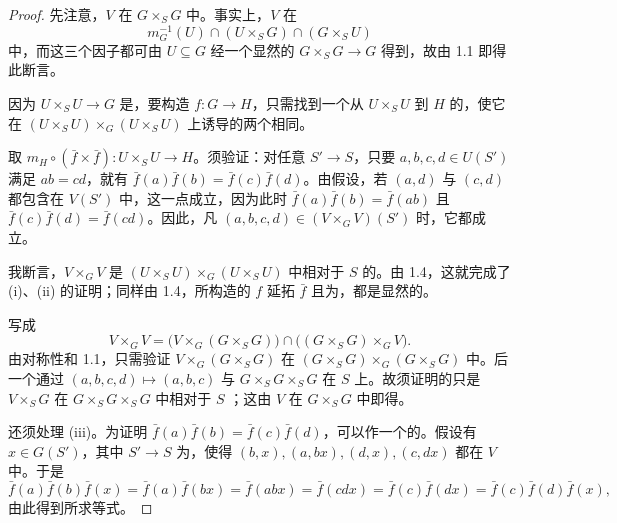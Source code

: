 \begin{proof}
先注意，$V$ 在 $G\times_S G$ 中。事实上，$V$ 在
\[
m_G^{-1}(U)\cap(U\times_S G)\cap(G\times_S U)
\]
中，而这三个因子都可由 $U\subseteq G$ 经一个显然的 $G\times_S G\to G$ 得到，故由 1.1 即得此断言。

因为 $U\times_S U\to G$ 是，要构造 $f:G\to H$，只需找到一个从 $U\times_S U$ 到 $H$ 的，使它在 $(U\times_S U)\times_G(U\times_S U)$ 上诱导的两个相同。

取 $m_H\circ(\bar f\times\bar f):U\times_S U\to H$。须验证：对任意 $S'\to S$，只要 $a,b,c,d\in U(S')$ 满足 $ab=cd$，就有 $\bar f(a)\bar f(b)=\bar f(c)\bar f(d)$。由假设，若 $(a,d)$ 与 $(c,d)$ 都包含在 $V(S')$ 中，这一点成立，因为此时 $\bar f(a)\bar f(b)=\bar f(ab)$ 且 $\bar f(c)\bar f(d)=\bar f(cd)$。因此，凡 $(a,b,c,d)\in(V\times_G V)(S')$ 时，它都成立。

我断言，$V\times_G V$ 是 $(U\times_S U)\times_G(U\times_S U)$ 中相对于 $S$ 的。由 1.4，这就完成了 (i)、(ii) 的证明；同样由 1.4，所构造的 $f$ 延拓 $\bar f$ 且为，都是显然的。

写成
\[
V\times_G V=\bigl(V\times_G(G\times_S G)\bigr)\cap\bigl((G\times_S G)\times_G V\bigr).
\]
由对称性和 1.1，只需验证 $V\times_G(G\times_S G)$ 在 $(G\times_S G)\times_G(G\times_S G)$ 中。后一个通过 $(a,b,c,d)\mapsto(a,b,c)$ 与 $G\times_S G\times_S G$ 在 $S$ 上。故须证明的只是 $V\times_S G$ 在 $G\times_S G\times_S G$ 中相对于 $S$ ；这由 $V$ 在 $G\times_S G$ 中即得。

还须处理 (iii)。为证明 $\bar f(a)\bar f(b)=\bar f(c)\bar f(d)$，可以作一个的。假设有 $x\in G(S')$，其中 $S'\to S$ 为，使得 $(b,x),(a,bx),(d,x),(c,dx)$ 都在 $V$ 中。于是
\[
\bar f(a)\bar f(b)\bar f(x)=\bar f(a)\bar f(bx)=\bar f(abx)=\bar f(cdx)=\bar f(c)\bar f(dx)=\bar f(c)\bar f(d)\bar f(x),
\]
由此得到所求等式。


\end{proof}
